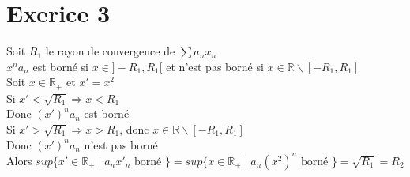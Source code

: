 \documentclass{article}
\author{Frederic Becerril}
\begin{document}
\part*{Exerice 3}

Soit $R_1$ le rayon de convergence de $\sum a_n x_n$\\
$x^n a_n$ est borné si $x \in ]-R_1, R_1[$ et n'est pas borné si $x \in \mathbb{R} \backslash [-R_1, R_1]$\\
Soit $x \in \mathbb{R}_+$ et $x' = x^2$\\
Si $x' < \sqrt{R_1} \Rightarrow x < R_1$\\
Donc $(x')^n a_n$ est borné\\
Si $x' > \sqrt{R_1} \Rightarrow x > R_1$, donc $x \in \mathbb{R} \backslash [-R_1, R_1]$\\
Donc $(x')^n a_n$ n'est pas borné\\
Alors $sup \{x'\in \mathbb{R}_+ \;|\; a_n x'_n \mbox{ borné }\} = sup \{x\in \mathbb{R}_+ \;|\; a_n (x^2)^n \mbox{ borné }\} = \sqrt{R_1} = R_2$\\
\end{document}
